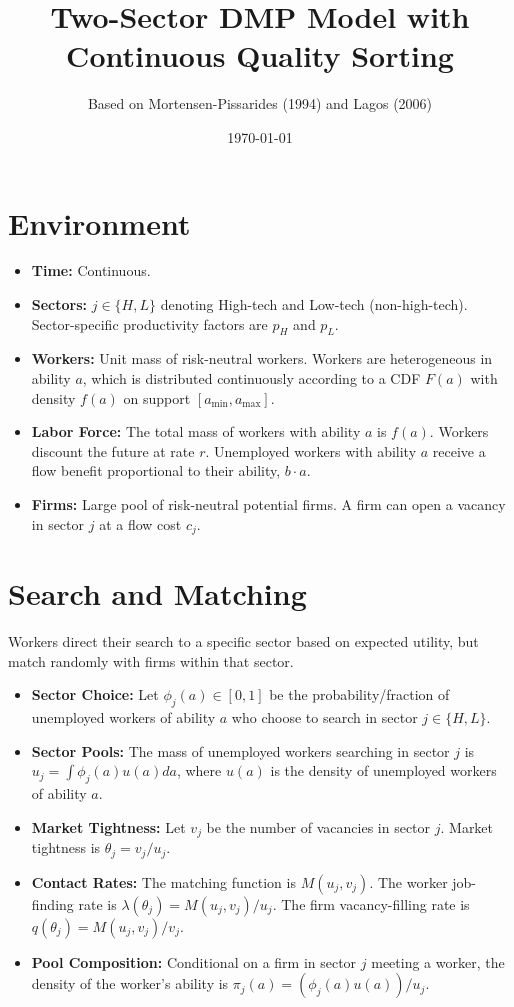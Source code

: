\documentclass[11pt]{article}
\title{Two-Sector DMP Model with Continuous Quality Sorting}
\author{Based on Mortensen-Pissarides (1994) and Lagos (2006)}
\date{\today}
\begin{document}
\maketitle

\section{Environment}
\begin{itemize}
    \item \textbf{Time:} Continuous.
    \item \textbf{Sectors:} $j \in \{H, L\}$ denoting High-tech and Low-tech (non-high-tech). Sector-specific productivity factors are $p_H$ and $p_L$.
    \item \textbf{Workers:} Unit mass of risk-neutral workers. Workers are heterogeneous in ability $a$, which is distributed continuously according to a CDF $F(a)$ with density $f(a)$ on support $[a_{\min}, a_{\max}]$.
    \item \textbf{Labor Force:} The total mass of workers with ability $a$ is $f(a)$. Workers discount the future at rate $r$. Unemployed workers with ability $a$ receive a flow benefit proportional to their ability, $b \cdot a$.
    \item \textbf{Firms:} Large pool of risk-neutral potential firms. A firm can open a vacancy in sector $j$ at a flow cost $c_j$.
\end{itemize}

\section{Search and Matching}
Workers direct their search to a specific sector based on expected utility, but match randomly with firms within that sector.
\begin{itemize}
    \item \textbf{Sector Choice:} Let $\phi_{j}(a) \in [0, 1]$ be the probability/fraction of unemployed workers of ability $a$ who choose to search in sector $j \in \{H, L\}$.
    \item \textbf{Sector Pools:} The mass of unemployed workers searching in sector $j$ is $u_j = \int \phi_{j}(a) u(a) da$, where $u(a)$ is the density of unemployed workers of ability $a$.
    \item \textbf{Market Tightness:} Let $v_j$ be the number of vacancies in sector $j$. Market tightness is $\theta_j = v_j / u_j$.
    \item \textbf{Contact Rates:} The matching function is $M(u_j, v_j)$. The worker job-finding rate is $\lambda(\theta_j) = M(u_j, v_j) / u_j$. The firm vacancy-filling rate is $q(\theta_j) = M(u_j, v_j) / v_j$.
    \item \textbf{Pool Composition:} Conditional on a firm in sector $j$ meeting a worker, the density of the worker's ability is $\pi_{j}(a) = (\phi_{j}(a) u(a)) / u_j$.
\end{itemize}
\end{document}
